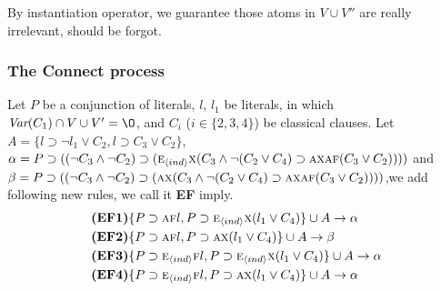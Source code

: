 \documentclass[letterpaper]{article} %
\begin{document}
By instantiation operator, we guarantee those atoms in $V\cup V''$ are really irrelevant, \ie should be forgot.


\subsubsection{The Connect process}
Let $P$ be a conjunction of literals, $l$, $l_1$ be literals, in which $\Var(C_1)\cap V \cup V' = {\O}$, and $C_i$ ($i\in \{2,3,4\}$) be classical clauses.
Let $A=\{l \supset \neg l_1 \vee C_2, l \supset C_3\vee C_2\}$, $\alpha=P \supset ((\neg C_3 \wedge \neg C_2) \supset  (\textsc{e}_{{\langle{ind}\rangle}}\textsc{x}(C_3 \wedge \neg (C_2 \vee C_4) \supset \textsc{a}\textsc{x} \textsc{a}\textsc{f}(C_3 \vee C_2))))$ and $\beta = P \supset ((\neg C_3 \wedge \neg C_2) \supset (\textsc{a}\textsc{x}(C_3 \wedge  \neg (C_2 \vee C_4) \supset \textsc{a}\textsc{x} \textsc{a}\textsc{f}(C_3 \vee C_2))))$,we add following new rules, we call it \textbf{EF} imply.
\begin{align*}
& \textbf{(EF1)} \{P\supset \textsc{a}\textsc{f} l, P\supset \textsc{e}_{{\langle{ind}\rangle}}\textsc{x} (l_1 \vee C_4)\}\cup A \rightarrow \alpha \\
& \textbf{(EF2)} \{P\supset \textsc{a}\textsc{f} l, P\supset \textsc{a} \textsc{x} (l_1 \vee C_4)\}\cup A \rightarrow \beta \\
& \textbf{(EF3)} \{P\supset \textsc{e}_{{\langle{ind}\rangle}}\textsc{f} l, P\supset \textsc{e}_{{\langle{ind}\rangle}}\textsc{x} (l_1 \vee C_4)\}\cup A \rightarrow \alpha  \\
& \textbf{(EF4)} \{P\supset \textsc{e}_{{\langle{ind}\rangle}}\textsc{f} l, P\supset \textsc{a}\textsc{x} (l_1 \vee C_4)\}\cup A \rightarrow \alpha
\end{align*}
\end{document}
